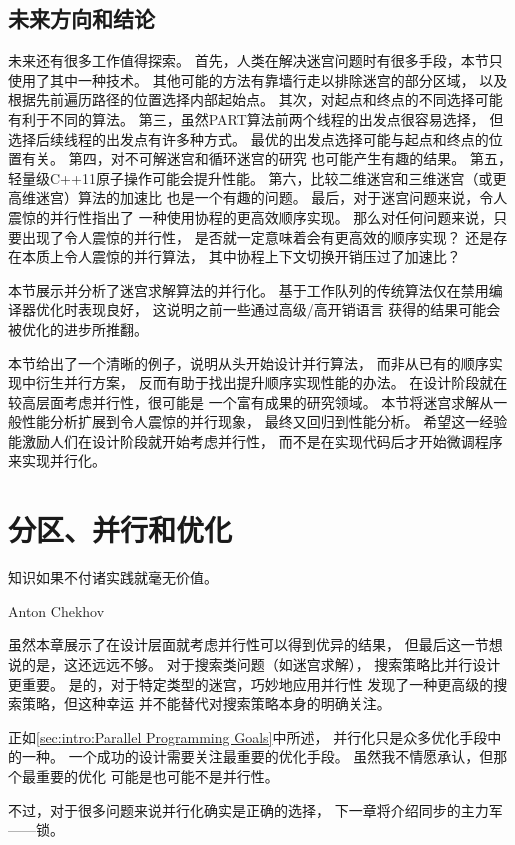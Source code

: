 \QuickQuizEnd

\subsection{未来方向和结论}
\label{sec:SMPdesign:Future Directions and Conclusions}

未来还有很多工作值得探索。
首先，人类在解决迷宫问题时有很多手段，本节只使用了其中一种技术。
其他可能的方法有靠墙行走以排除迷宫的部分区域，
以及根据先前遍历路径的位置选择内部起始点。
其次，对起点和终点的不同选择可能有利于不同的算法。
第三，虽然PART算法前两个线程的出发点很容易选择，
但选择后续线程的出发点有许多种方式。
最优的出发点选择可能与起点和终点的位置有关。
第四，对不可解迷宫和循环迷宫的研究
也可能产生有趣的结果。
第五，轻量级C++11原子操作可能会提升性能。
第六，比较二维迷宫和三维迷宫（或更高维迷宫）算法的加速比
也是一个有趣的问题。
最后，对于迷宫问题来说，令人震惊的并行性指出了
一种使用协程的更高效顺序实现。
那么对任何问题来说，只要出现了令人震惊的并行性，
是否就一定意味着会有更高效的顺序实现？
还是存在本质上令人震惊的并行算法，
其中协程上下文切换开销压过了加速比？

本节展示并分析了迷宫求解算法的并行化。
基于工作队列的传统算法仅在禁用编译器优化时表现良好，
这说明之前一些通过高级/高开销语言
获得的结果可能会被优化的进步所推翻。

本节给出了一个清晰的例子，说明从头开始设计并行算法，
而非从已有的顺序实现中衍生并行方案，
反而有助于找出提升顺序实现性能的办法。
在设计阶段就在较高层面考虑并行性，很可能是
一个富有成果的研究领域。
本节将迷宫求解从一般性能分析扩展到令人震惊的并行现象，
最终又回归到性能分析。
希望这一经验能激励人们在设计阶段就开始考虑并行性，
而不是在实现代码后才开始微调程序来实现并行化。

\section{分区、并行和优化}
\label{sec:SMPdesign:Partitioning; Parallelism; and Optimization}
%
\epigraph{知识如果不付诸实践就毫无价值。}
	 {Anton Chekhov}

虽然本章展示了在设计层面就考虑并行性可以得到优异的结果，
但最后这一节想说的是，这还远远不够。
对于搜索类问题（如迷宫求解），
搜索策略比并行设计更重要。
是的，对于特定类型的迷宫，巧妙地应用并行性
发现了一种更高级的搜索策略，但这种幸运
并不能替代对搜索策略本身的明确关注。

正如\cref{sec:intro:Parallel Programming Goals}中所述，
并行化只是众多优化手段中的一种。
一个成功的设计需要关注最重要的优化手段。
虽然我不情愿承认，但那个最重要的优化
可能是也可能不是并行性。

不过，对于很多问题来说并行化确实是正确的选择，
下一章将介绍同步的主力军——锁。

